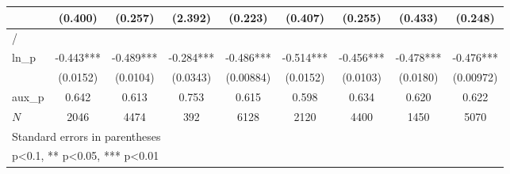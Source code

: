 \begin{table}[htbp]
\begin{tabular}{l*{8}{c}}
            &     (0.400)   &     (0.257)   &     (2.392)   &     (0.223)   &     (0.407)   &     (0.255)   &     (0.433)   &     (0.248)   \\
\hline
/           &               &               &               &               &               &               &               &               \\
ln\_p        &      -0.443***&      -0.489***&      -0.284***&      -0.486***&      -0.514***&      -0.456***&      -0.478***&      -0.476***\\
            &    (0.0152)   &    (0.0104)   &    (0.0343)   &   (0.00884)   &    (0.0152)   &    (0.0103)   &    (0.0180)   &   (0.00972)   \\
\hline
aux\_p       &       0.642   &       0.613   &       0.753   &       0.615   &       0.598   &       0.634   &       0.620   &       0.622   \\
\(N\)       &        2046   &        4474   &         392   &        6128   &        2120   &        4400   &        1450   &        5070   \\
\hline\hline
\multicolumn{9}{l}{\footnotesize Standard errors in parentheses}\\
\multicolumn{9}{l}{\footnotesize * p<0.1, ** p<0.05, *** p<0.01}\\
\end{tabular}
\end{table}
